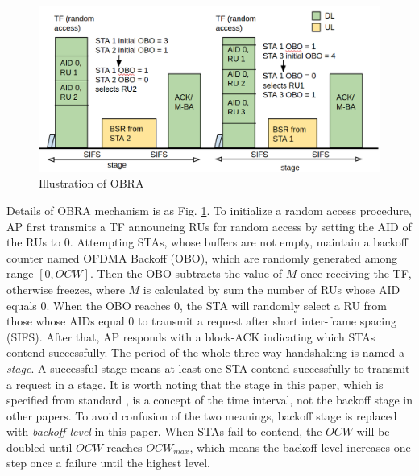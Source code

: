 \documentclass[journal]{IEEEtran}
\begin{document}
\begin{figure}[!h]
\centering
\includegraphics[scale=0.24]{./figure/Section_preliminary/fig_RA_illu.png}
\caption{Illustration of OBRA}
\label{fig_ra_illu}
\end{figure}
Details of OBRA mechanism is as Fig. \ref{fig_ra_illu}. 
To initialize a random access procedure, AP first transmits a TF announcing RUs for random access by setting the AID of the RUs to 0. 
Attempting STAs, whose buffers are not empty, maintain a backoff counter named OFDMA Backoff (OBO), which are randomly generated among range $[0, OCW]$.
Then the OBO subtracts the value of $M$ once receiving the TF, otherwise freezes, where $M$ is calculated by sum the number of RUs whose AID equals 0.  
When the OBO reaches 0, the STA will randomly select a RU from those whose AIDs equal 0 to transmit a request after short inter-frame spacing (SIFS). 
After that, AP responds with a block-ACK indicating which STAs contend successfully. The period of the whole three-way handshaking is named a \textit{stage}.
A successful stage means at least one STA contend successfully to transmit a request in a stage. 
It is worth noting that the stage in this paper, which is specified from standard \cite{draft_ax}, is a concept of the time interval, not the backoff stage in other papers.
To avoid confusion of the two meanings, backoff stage is replaced with \textit{backoff level} in this paper.  
When STAs fail to contend, the $OCW$ will be doubled until $OCW$ reaches $OCW_{max}$, which means the backoff level increases one step once a failure until the highest level.
\end{document}
